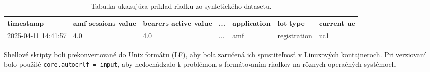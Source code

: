 \begin{table}[H]
\caption{Tabuľka ukazujúca príklad riadku zo syntetického datasetu.}
\begin{tabular}{ |p{2cm}|p{1.7cm}|p{1.6cm}|p{0.3cm}|p{2cm}|p{2cm}|p{2cm}|  }
\hline
 timestamp & amf sessions value & bearers active value & ... & application & lot type & current uc \\
 \hline
 2025-04-11 14:41:57  & 4.0  & 4.0 & ... & amf & registration & uc1  \\
 \hline
\end{tabular}
\label{table:dataset}
\end{table}


Shellové skripty boli prekonvertované do Unix formátu (LF), aby bola zaručená ich spustiteľnosť v Linuxových kontajneroch. Pri verziovaní bolo použité \texttt{core.autocrlf = input}, aby nedochádzalo k problémom s formátovaním riadkov na rôznych operačných systémoch.